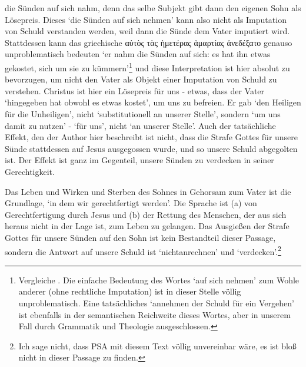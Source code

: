 die Sünden auf sich nahm, denn das selbe Subjekt gibt dann den eigenen Sohn als Lösepreis.
Dieses `die Sünden auf sich nehmen' kann also nicht als Imputation von Schuld verstanden werden, weil dann die Sünde dem Vater imputiert wird.
Stattdessen kann das griechische αὐτὸς τὰς ἡμετέρας ἁμαρτίας ἀνεδέξατο genauso unproblematisch bedeuten
`er nahm die Sünden auf sich: es hat ihn etwas gekostet, sich um sie zu kümmern'\footnote{
	Vergleiche \Cite[ἀναδέχομαι]{lsj}. Die einfache Bedeutung des Wortes `auf sich nehmen' zum Wohle anderer (ohne rechtliche Imputation) ist in dieser Stelle völlig unproblematisch.
	Eine tatsächliches `annehmen der Schuld für ein Vergehen' ist ebenfalls in der semantischen Reichweite dieses Wortes, aber in unserem Fall durch Grammatik und Theologie ausgeschlossen.
} und diese Interpretation ist hier absolut zu bevorzugen, um nicht den Vater als Objekt einer Imputation von Schuld zu verstehen.
Christus ist hier ein Lösepreis für uns - etwas, dass der Vater `hingegeben hat obwohl es etwas kostet', um uns zu befreien.
Er gab `den Heiligen für die Unheiligen', nicht `substitutionell an unserer Stelle', sondern `um uns damit zu nutzen' - `für uns', nicht `an unserer Stelle'.
Auch der tatsächliche Effekt, den der Author hier beschreibt ist nicht, dass die Strafe Gottes für unsere Sünde stattdessen auf Jesus ausgegossen wurde, und so unsere Schuld abgegolten ist.
Der Effekt ist ganz im Gegenteil, unsere Sünden zu verdecken in seiner Gerechtigkeit.

Das Leben und Wirken und Sterben des Sohnes in Gehorsam zum Vater ist die Grundlage, `in dem wir gerechtfertigt werden'.
Die Sprache ist (a) von Gerechtfertigung durch Jesus und (b) der Rettung des Menschen, der aus sich heraus nicht in der Lage ist, zum Leben zu gelangen.
Das Ausgießen der Strafe Gottes für unsere Sünden auf den Sohn ist kein Bestandteil dieser Passage,
sondern die Antwort auf unsere Schuld ist `nichtanrechnen' und `verdecken'.\footnote{
Ich sage nicht, dass PSA mit diesem Text völlig unvereinbar wäre, es ist bloß nicht in dieser Passage zu finden.}

